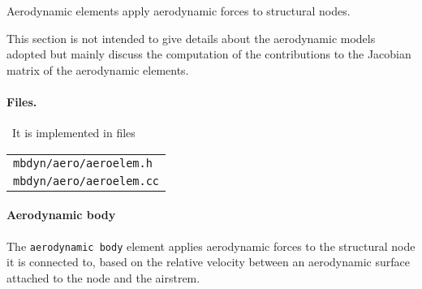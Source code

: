 %
%
%
%
%
% 
%
%
%

Aerodynamic elements apply aerodynamic forces to structural nodes.

This section is not intended 
to give details about the aerodynamic models adopted but mainly 
discuss the computation of the contributions to the Jacobian 
matrix of the aerodynamic elements.

\paragraph{Files.} \
It is implemented in files\\
\begin{tabular}{l}
\texttt{mbdyn/aero/aeroelem.h} \\
\texttt{mbdyn/aero/aeroelem.cc} 
\end{tabular}

\paragraph{Aerodynamic body}

The \texttt{aerodynamic body} element applies aerodynamic forces
to the structural node it is connected to,
based on the relative velocity between an aerodynamic surface attached 
to the node and the airstrem.

